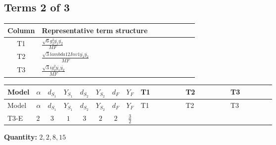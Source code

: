 \documentclass[8pt]{article}
\begin{document}
\begin{landscape}
\subsection*{Terms 2 of 3}
\begin{center}
\begin{tabular}{@{}c >{\raggedright\arraybackslash}p{0.82\linewidth}@{}}
\toprule
Column & Representative term structure \\
\midrule
T1 & \(\displaystyle \frac{\sqrt{6} g_{2}^{2} \overline{y_{1}} \overline{y_{2}}}{MF}\) \\
\midrule
T2 & \(\displaystyle \frac{\sqrt{3} lambda12Inv1 \overline{y_{1}} \overline{y_{2}}}{MF}\) \\
\midrule
T3 & \(\displaystyle \frac{\sqrt{3} i g_{2}^{2} \overline{y_{1}} \overline{y_{2}}}{MF}\) \\
\midrule
\bottomrule
\end{tabular}
\end{center}
\smallskip
\tiny
\begin{longtable}{@{}llcccccc >{\raggedright\arraybackslash}p{0.21\linewidth} >{\raggedright\arraybackslash}p{0.21\linewidth} >{\raggedright\arraybackslash}p{0.21\linewidth}@{}}
\toprule
Model & $\alpha$ & $d_{S_1}$ & $Y_{S_1}$ & $d_{S_2}$ & $Y_{S_2}$ & $d_F$ & $Y_F$ & T1 & T2 & T3 \\
\midrule
\endfirsthead
\toprule
Model & $\alpha$ & $d_{S_1}$ & $Y_{S_1}$ & $d_{S_2}$ & $Y_{S_2}$ & $d_F$ & $Y_F$ & T1 & T2 & T3 \\
\midrule
\endhead
T3-E & $2$ & $3$ & $1$ & $3$ & $2$ & $2$ & $\frac{3}{2}$ & \scriptsize\adjustbox{max width=\linewidth}{$\begin{gathered} - \frac{\sqrt{6} g_{2}^{2} \overline{y_{1}} \overline{y_{2}}}{3 MF}\end{gathered}$} & \scriptsize\adjustbox{max width=\linewidth}{$\begin{gathered} \frac{\sqrt{3} lambda12Inv1 \overline{y_{1}} \overline{y_{2}}}{6 MF}\end{gathered}$} & \scriptsize\adjustbox{max width=\linewidth}{$\begin{gathered} - \frac{\sqrt{3} i g_{2}^{2} \overline{y_{1}} \overline{y_{2}}}{6 MF}\end{gathered}$} \\
\midrule
\bottomrule
\end{longtable}
\clearpage
\noindent\textbf{Quantity: }$\mathrm{2,2,8,15}$\par\smallskip

\end{landscape}
\end{document}
